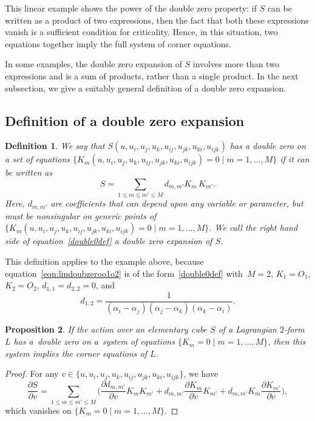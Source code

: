\documentclass[pdftex]{sigma}
\newcommand{\pdv}[2]{\frac{\partial {#1}}{\partial {#2}}}
\newtheorem{Definition}{Definition}[section]
\newtheorem{Proposition}[Definition]{Proposition}
\numberwithin{equation}{section}
\begin{document}
This linear example shows the power of the double zero property: if $S$ can be written as a product of two expressions, then the fact that both these expressions vanish is a sufficient condition for criticality. Hence, in this situation, two equations together imply the full system of corner equations.

In some examples, the double zero expansion of $S$ involves more than two expressions and is a sum of products, rather than a single product. In the next subsection, we give a suitably general definition of a double zero expansion.

\subsection{Definition of a double zero expansion}

\begin{Definition}\label{def:doublezero}
 We say that $S(u,u_i,u_j,u_k,u_{ij},u_{jk},u_{ki},u_{ijk})$ has a \emph{double zero} on a set of equations $\{ K_m(u,u_i,u_j,u_k,u_{ij},u_{jk},u_{ki},u_{ijk})=0 \mid m = 1, \dots, M \}$ if it can be written as
 \begin{equation}
 \label{double0def}
 S = \sum_{1 \leq m \leq m' \leq M} d_{m,m'} K_m \, K_{m'} .
 \end{equation}
 Here, $d_{m,m'}$ are coefficients that can depend upon any variable or parameter, but must be nonsingular on generic points of $\{ K_m(u,u_i,u_j,u_k,u_{ij},u_{jk},u_{ki},u_{ijk})=0 \mid m = 1, \dots, M \}$.
 We call the right hand side of equation~\eqref{double0def} a \emph{double zero expansion} of $S$.
\end{Definition}

This definition applies to the example above, because equation~\eqref{eqn:lindoubzeroo1o2} is of the form~\eqref{double0def} with~${M=2}$, $K_1 = O_1$, $K_2 = O_2$, $d_{1,1} = d_{2,2} = 0$, and
\[d_{1,2} = \frac{1}{(\alpha_i - \alpha_j)(\alpha_j - \alpha_k)(\alpha_k - \alpha_i)} .\]

\begin{Proposition}
 If the action over an elementary cube $S$ of a Lagrangian $2$-form $L$ has a~double zero on a~system of equations $\{ K_m=0 \mid m = 1, \dots, M\}$, then this system implies the corner equations of $L$.
\end{Proposition}
\begin{proof}
 For any $v \in \{u,u_i,u_j,u_k,u_{ij},u_{jk},u_{ki},u_{ijk}\}$, we have
 \[
 \pdv{S}{v} = \sum_{1 \leq m \leq m' \leq M} \biggl( \pdv{d_{m,m'}}{v} K_m K_{m'} + d_{m,m'} \pdv{K_m}{v} K_{m'} + d_{m,m'} K_m \pdv{K_{m'}}{v} \biggr),
 \]
 which vanishes on $\{ K_m=0 \mid m = 1, \dots, M \}$.
\end{proof}
\end{document}
